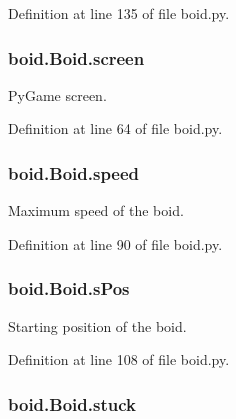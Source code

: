 Definition at line 135 of file boid.\-py.

\hypertarget{classboid_1_1Boid_aa230e5710394a620995a3943fc9faa8d}{
\subsubsection[{screen}]{\setlength{\rightskip}{0pt plus 5cm}boid.\-Boid.\-screen}}\label{classboid_1_1Boid_aa230e5710394a620995a3943fc9faa8d}


Py\-Game screen. 



Definition at line 64 of file boid.\-py.

\hypertarget{classboid_1_1Boid_a4cf2a59e0efad2d71d8fee93fdd6538b}{
\subsubsection[{speed}]{\setlength{\rightskip}{0pt plus 5cm}boid.\-Boid.\-speed}}\label{classboid_1_1Boid_a4cf2a59e0efad2d71d8fee93fdd6538b}


Maximum speed of the boid. 



Definition at line 90 of file boid.\-py.

\hypertarget{classboid_1_1Boid_a92bf79dcfff9e21d33611cfc89f8823c}{
\subsubsection[{s\-Pos}]{\setlength{\rightskip}{0pt plus 5cm}boid.\-Boid.\-s\-Pos}}\label{classboid_1_1Boid_a92bf79dcfff9e21d33611cfc89f8823c}


Starting position of the boid. 



Definition at line 108 of file boid.\-py.

\hypertarget{classboid_1_1Boid_a099882fd7d72bfd06c15ec20b0425905}{
\subsubsection[{stuck}]{\setlength{\rightskip}{0pt plus 5cm}boid.\-Boid.\-stuck}}\label{classboid_1_1Boid_a099882fd7d72bfd06c15ec20b0425905}


